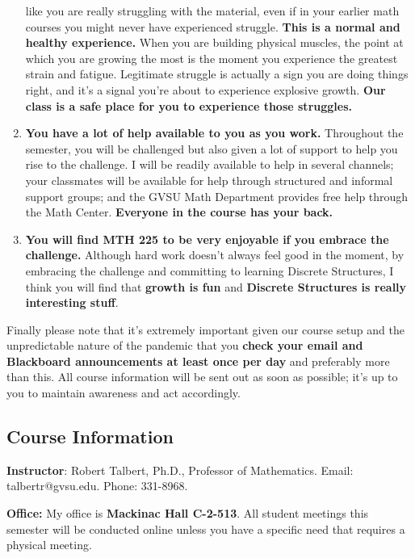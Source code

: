 \documentclass[]{article}
\begin{document}
\begin{enumerate}
  like you are really struggling with the material, even if in your
  earlier math courses you might never have experienced struggle.
  \textbf{This is a normal and healthy experience.} When you are
  building physical muscles, the point at which you are growing the most
  is the moment you experience the greatest strain and fatigue.
  Legitimate struggle is actually a sign you are doing things right, and
  it's a signal you're about to experience explosive growth. \textbf{Our
  class is a safe place for you to experience those struggles.}
\item
  \textbf{You have a lot of help available to you as you work.}
  Throughout the semester, you will be challenged but also given a lot
  of support to help you rise to the challenge. I will be readily
  available to help in several channels; your classmates will be
  available for help through structured and informal support groups; and
  the GVSU Math Department provides free help through the Math Center.
  \textbf{Everyone in the course has your back.}
\item
  \textbf{You will find MTH 225 to be very enjoyable if you embrace the
  challenge.} Although hard work doesn't always feel good in the moment,
  by embracing the challenge and committing to learning Discrete
  Structures, I think you will find that \textbf{growth is fun} and
  \textbf{Discrete Structures is really interesting stuff}.
\end{enumerate}

Finally please note that it's extremely important given our course setup
and the unpredictable nature of the pandemic that you \textbf{check your
email and Blackboard announcements at least once per day} and preferably
more than this. All course information will be sent out as soon as
possible; it's up to you to maintain awareness and act accordingly.

\hypertarget{course-information}{%
\subsection{Course Information}\label{course-information}}

\textbf{Instructor}: Robert Talbert, Ph.D., Professor of Mathematics.
Email: talbertr@gvsu.edu. Phone: 331-8968.

\textbf{Office:} My office is \textbf{Mackinac Hall C-2-513}. All
student meetings this semester will be conducted online unless you have
a specific need that requires a physical meeting.
\end{document}
